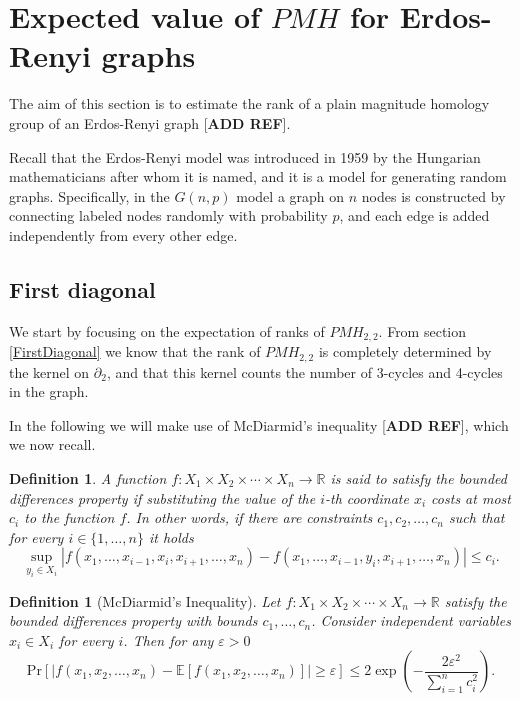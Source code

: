 \documentclass{article}
\newtheorem{definition}[theorem]{Definition}
\newcommand{\E}{\mathbb{E}}
\newcommand{\R}{\mathbb{R}}
\newcommand{\Prob}{\mathrm{Pr}}
\begin{document}
	\section{Expected value of $PMH$ for Erdos-Renyi graphs}
	
	The aim of this section is to estimate the rank of a plain magnitude homology group of an Erdos-Renyi graph [\textbf{ADD REF}].
	
	Recall that the Erdos-Renyi model was introduced in 1959 by the Hungarian mathematicians after whom it is named, and it is a model for generating random graphs.
	Specifically, in the $G(n,p)$ model a graph on $n$ nodes is constructed by connecting labeled nodes randomly with probability $p$, and each edge is added independently from every other edge. 
	
	\subsection{First diagonal}
	
	We start by focusing on the expectation of ranks of $PMH_{2,2}$.
	From section \ref{FirstDiagonal} we know that the rank of $PMH_{2,2}$ is completely determined by the kernel on $\partial_2$, and that this kernel counts the number of 3-cycles and 4-cycles in the graph.
	
	In the following we will make use of McDiarmid's inequality [\textbf{ADD REF}], which we now recall.
	
	\begin{definition}
		A function $f:X_1 \times X_2 \times \cdots \times X_n \to \R$ is said to satisfy the bounded differences property if substituting the value of the $i$-th coordinate $x_i$ costs at most $c_i$ to the function $f$.
		In other words, if there are constraints $c_1,c_2,\dots,c_n$ such that for every $i \in \{1,\dots,n\}$ it holds
		\[
		\sup_{y_i \in X_i} \left| f(x_1,\dots,x_{i-1},x_i,x_{i+1},\dots,x_n) - f(x_1,\dots,x_{i-1},y_i,x_{i+1},\dots,x_n) \right| \leq c_i.
		\]
	\end{definition}
	
	\begin{definition}[McDiarmid's Inequality]
		Let $f:X_1 \times X_2 \times \cdots \times X_n \to \R$ satisfy the bounded differences property with bounds $c_1,\dots,c_n$.
		Consider independent variables $x_i \in X_i$ for every $i$.
		Then for any $\varepsilon >0$
		\[
		\Prob[\left|f(x_1,x_2,\dots,x_n)-\E[f(x_1,x_2,\dots,x_n)]\right| \geq \varepsilon] \leq 2 \exp \left(-\frac{2\varepsilon^2}{\sum_{i=1}^n c_i^2} \right).
		\]
		
	\end{definition}
	
\end{document}
